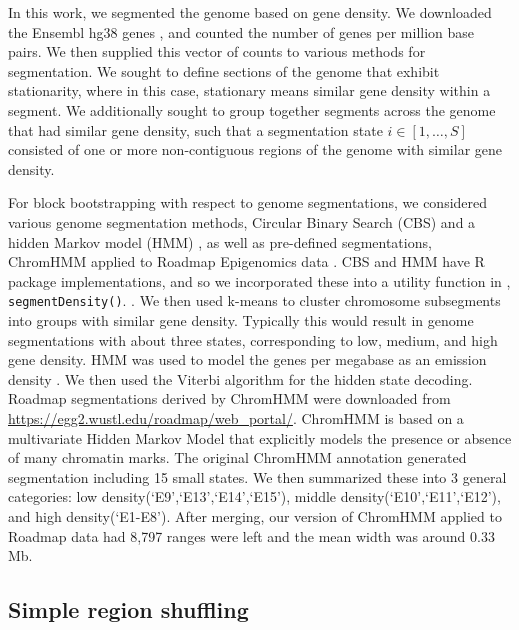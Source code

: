 \documentclass{article}
\begin{document}
In this work, we segmented the genome based on gene density. We
downloaded the Ensembl hg38 genes \citep{ensemblTrimmedEntry} 
, 
and counted the 
number of genes per million base pairs. We then supplied this vector
of counts to various methods for segmentation. We sought to define
sections of the genome that exhibit stationarity, where in this case,
stationary means similar gene density within a segment. We
additionally sought to group together segments across the genome that
had similar gene density, such that a segmentation state
$i \in [1,\dots,S]$ consisted of one or more non-contiguous regions of
the genome with similar gene density.

For block bootstrapping with respect to genome segmentations,
we considered various genome segmentation methods,
Circular Binary Search (CBS) \citep{cbs} and a hidden Markov model (HMM)
\citep{rcpphmm}, as well as pre-defined segmentations,
ChromHMM applied to 
Roadmap Epigenomics data \citep{ernst2012chromhmm}.
CBS and HMM
have R package implementations, and so we incorporated these
into a utility function in \nullranges, \texttt{segmentDensity()}.
. We then used k-means to cluster
chromosome subsegments into groups with similar gene
density. Typically this would result in genome segmentations with
about three states, corresponding to low, medium, and high gene
density. 
HMM was used to model the genes per megabase as an emission
density  . We then used the
Viterbi algorithm for the hidden state decoding. 
Roadmap segmentations derived by ChromHMM \citep{ernst2012chromhmm} were
downloaded from
\url{https://egg2.wustl.edu/roadmap/web_portal/}. ChromHMM is based on
a multivariate Hidden Markov Model that explicitly models the presence
or absence of many chromatin marks. The original ChromHMM annotation
generated segmentation including 
15 small states. We then summarized these into 3 general categories: low
density(`E9',`E13',`E14',`E15'), middle density(`E10',`E11',`E12'),
and high density(`E1-E8'). 
After merging, our version of ChromHMM applied to Roadmap data had
8,797 ranges were left and the mean width was around 
0.33 Mb.

\subsection{Simple region shuffling}\label{sec:shuffle}
\end{document}
